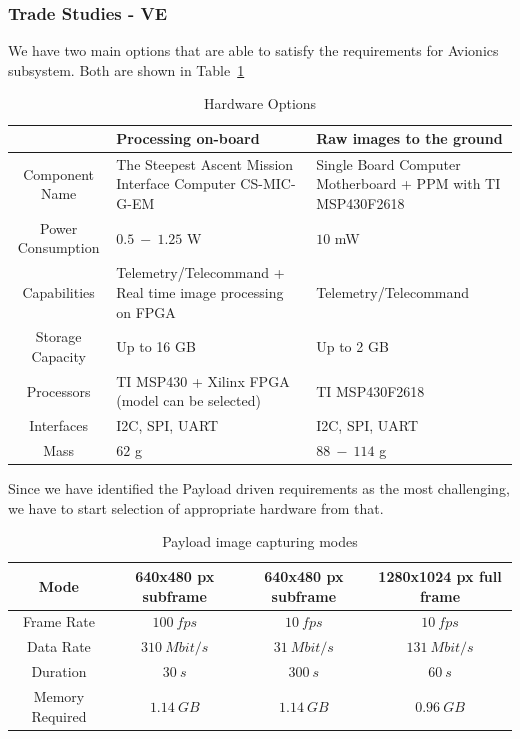 \documentclass[12pt]{article}
\begin{document}
			\subsubsection{Trade Studies - VE}
We have two main options that are able to satisfy the requirements for Avionics subsystem. Both are shown in Table~\ref{table:avionics_hardware_options}

\begin{table}[ht]
\caption{Hardware Options}
\label{table:avionics_hardware_options}
\begin{center}
    \begin{tabular}{| c || p{6cm} | p{6cm} |} \hline
     &	Processing on-board & Raw images to the ground \\ \hline \hline
    Component Name & The Steepest Ascent Mission Interface Computer CS-MIC-G-EM & Single Board Computer Motherboard + PPM with TI MSP430F2618 \\ \hline
    Power Consumption & $0.5\ -\ 1.25$ W & $10$ mW \\ \hline
    Capabilities & Telemetry/Telecommand + Real time image processing on FPGA & Telemetry/Telecommand\\ \hline
    Storage Capacity & Up to 16 GB & Up to 2 GB \\ \hline
    Processors & TI MSP430  + Xilinx FPGA (model can be selected) & TI MSP430F2618 \\ \hline
    Interfaces & I2C, SPI, UART & I2C, SPI, UART \\ \hline
    Mass & $62$ g & $88\ -\ 114$ g \\ \hline 
    \end{tabular}
\end{center}
\end{table}

Since we have identified the Payload driven requirements as the most challenging, we have to start selection of appropriate hardware from that.

\begin{table}[ht]
\caption{Payload image capturing modes}
\label{table:avionics_modes}
\begin{center}
    \begin{tabular}{| c || c | c | c |} \hline
    	Mode & 640x480 px subframe &  640x480 px subframe & 1280x1024 px  full frame \\ \hline \hline
    Frame Rate & $100\ fps$ & $10\ fps$ & $10\ fps$ \\
    Data Rate & $310\ Mbit/s$ & $31\ Mbit/s$ & $131\ Mbit/s$ \\
    Duration & $30\ s$ & $300\ s$ & $60\ s$ \\
    Memory Required & $1.14\ GB$ & $1.14\ GB$ & $0.96\ GB$ \\ \hline 
    \end{tabular}
\end{center}
\end{table}
\end{document}
